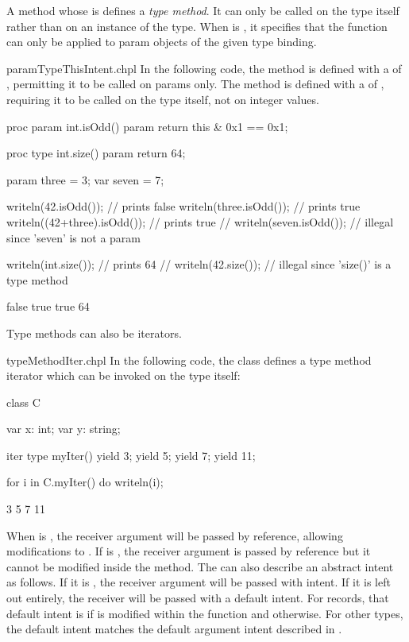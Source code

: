 A method whose  is  defines a \emph{type
method}.  It can only be called on the type itself rather than on an
instance of the type.  When  is , it
specifies that the function can only be applied to param objects of
the given type binding.

\begin{chapelexample}{paramTypeThisIntent.chpl}
In the following code, the  method is defined with
a  of , permitting it to be called on
params only.  The  method is defined with
a  of , requiring it to be called on
the  type itself, not on integer values.
\begin{chapel}
proc param int.isOdd() param {
  return this & 0x1 == 0x1;
}

proc type int.size() param {
  return 64;
}

param three = 3;
var seven = 7;

writeln(42.isOdd());          // prints false
writeln(three.isOdd());       // prints true
writeln((42+three).isOdd());  // prints true
// writeln(seven.isOdd());    // illegal since 'seven' is not a param

writeln(int.size());          // prints 64
// writeln(42.size());        // illegal since 'size()' is a type method
\end{chapel}
\begin{chapeloutput}
false
true
true
64
\end{chapeloutput}
\end{chapelexample}

Type methods can also be iterators.

\begin{chapelexample}{typeMethodIter.chpl}
In the following code, the class  defines a type method
iterator which can be invoked on the type itself:
\begin{chapel}
class C {
  var x: int;
  var y: string;

  iter type myIter() {
    yield 3;
    yield 5;
    yield 7;
    yield 11;
  }
}

for i in C.myIter() do
  writeln(i);
\end{chapel}
\begin{chapeloutput}
3
5
7
11
\end{chapeloutput}
\end{chapelexample}

When  is , the receiver argument will be
passed by reference, allowing modifications to .  If
 is , the receiver argument is passed
by reference but it cannot be modified inside the method. The
 can also describe an abstract intent as follows. If it is
, the receiver argument will be passed with 
intent. If it is left out entirely, the receiver will be passed with
a default intent. For records, that default intent is  if
 is modified within the function and 
otherwise.  For other types, the default  intent matches the
default argument intent described in .

